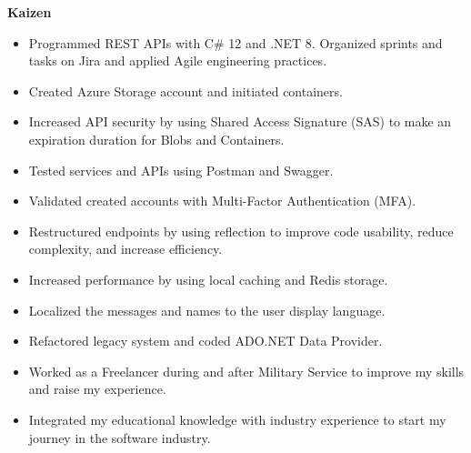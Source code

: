 





{\bfseries Kaizen}
\begin{itemize}
    \item Programmed REST APIs with C\# 12 and .NET 8. Organized sprints and tasks on Jira and applied Agile engineering practices.
    \item Created Azure Storage account and initiated containers.
    \item Increased API security by using Shared Access Signature (SAS) to make an expiration duration for Blobs and Containers.
    \item Tested services and APIs using Postman and Swagger.
    \item Validated created accounts with Multi-Factor Authentication (MFA).
    \item Restructured endpoints by using reflection to improve code usability, reduce complexity, and increase efficiency.
    \item Increased performance by using local caching and Redis storage.
    \item Localized the messages and names to the user display language.
    \item Refactored legacy system and coded ADO.NET Data Provider.
\end{itemize}

\divider

\begin{itemize}
    \item Worked as a Freelancer during and after Military Service to improve my skills and raise my experience.
    \item Integrated my educational knowledge with industry experience to start my journey in the software industry.
\end{itemize}

